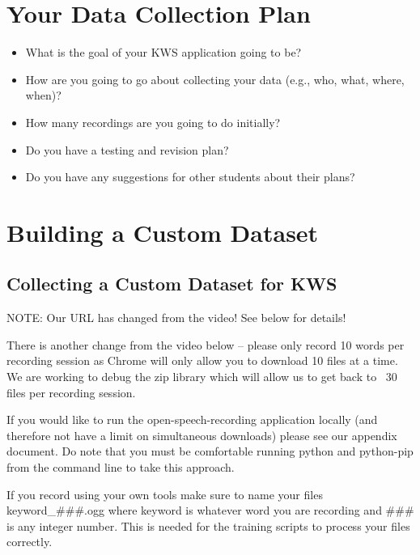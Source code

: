 \section{Your Data Collection Plan}

\begin{itemize}
    \item What is the goal of your KWS application going to be?
    
    \item How are you going to go about collecting your data (e.g., who, what, where, when)? 
    
    \item How many recordings are you going to do initially?
    
    \item Do you have a testing and revision plan?
    
    \item Do you have any suggestions for other students about their plans?
\end{itemize}            

\section{Building a Custom Dataset}

\subsection{Collecting a Custom Dataset for KWS}

NOTE: Our URL has changed from the video! See below for details!

There is another change from the video below -- please only record 10 words per recording session as Chrome will only allow you to download 10 files at a time. We are working to debug the zip library which will allow us to get back to ~30 files per recording session.

If you would like to run the open-speech-recording application locally (and therefore not have a limit on simultaneous downloads) please see our appendix document. Do note that you must be comfortable running python and python-pip from the command line to take this approach.

If you record using your own tools make sure to name your files keyword\_\#\#\#.ogg where keyword is whatever word you are recording and \#\#\# is any integer number. This is needed for the training scripts to process your files correctly.

